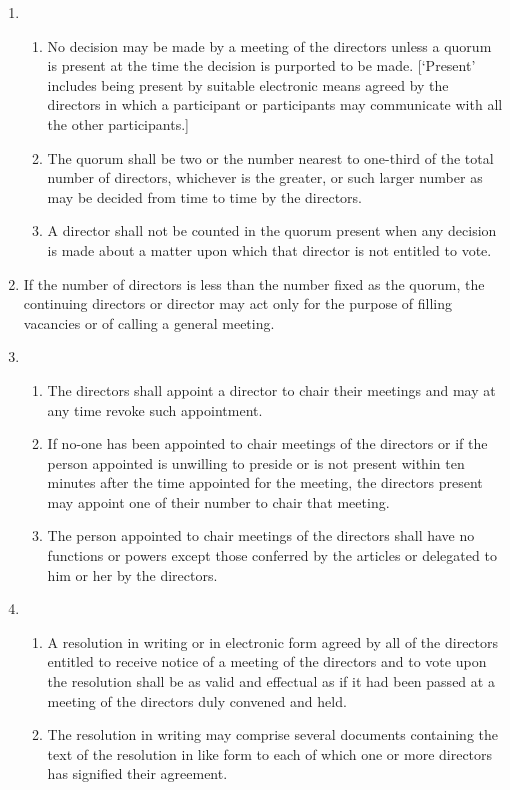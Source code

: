 \documentclass{article}
\begin{document}
\begin{enumerate}[label=\arabic*, start=23]
    \item \begin{enumerate}[label=(\arabic*)]
            \item No decision may be made by a meeting of the directors unless
            a quorum is present at the time the decision is purported to be
            made. [‘Present’ includes being present by suitable electronic
            means agreed by the directors in which a participant or
            participants may communicate with all the other participants.]
            \item The quorum shall be two or the number nearest to one-third
            of the total number of directors, whichever is the greater, or
            such larger number as may be decided from time to time by
            the directors.
            \item A director shall not be counted in the quorum present when any
            decision is made about a matter upon which that director is not
            entitled to vote.
    \end{enumerate}
    \item If the number of directors is less than the number fixed as the quorum,
    the continuing directors or director may act only for the purpose of
    filling vacancies or of calling a general meeting.
    \item \begin{enumerate}[label=(\arabic*)]
        \item The directors shall appoint a director to chair their meetings and
        may at any time revoke such appointment.
        \item If no-one has been appointed to chair meetings of the directors
        or if the person appointed is unwilling to preside or is not
        present within ten minutes after the time appointed for the
        meeting, the directors present may appoint one of their number
        to chair that meeting.
        \item The person appointed to chair meetings of the directors shall
        have no functions or powers except those conferred by the
        articles or delegated to him or her by the directors.
    \end{enumerate}
    \item \begin{enumerate}[label=(\arabic*)]
        \item A resolution in writing or in electronic form agreed by all of the
        directors entitled to receive notice of a meeting of the directors
        and to vote upon the resolution shall be as valid and effectual as
        if it had been passed at a meeting of the directors duly convened
        and held.
        \item The resolution in writing may comprise several documents
        containing the text of the resolution in like form to each of
        which one or more directors has signified their agreement.
    \end{enumerate}
    

\end{enumerate}
\end{document}
